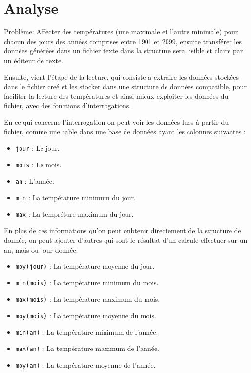 \section{Analyse}

Problème: Affecter des températures (une maximale et l’autre minimale) 
pour chacun des jours des années comprises entre 1901 et 2099,
ensuite transférer les données générées dans un fichier texte
dans la structure sera lisible et claire par un éditeur de texte.

Ensuite, vient l’étape de la lecture, qui consiste a extraire les données
 stockées dans le fichier creé et les stocker dans une 
 structure de données compatible, pour faciliter la lecture des températures
et ainsi mieux exploiter les données du fichier, avec des fonctions d’interrogations.

En ce qui concerne l'interrogation on peut voir les données lues à partir du fichier, 
comme une table dans une base de données ayant les colonnes suivantes : 

\begin{itemize}
  \item \lstinline$jour$ : Le jour.
  \item \lstinline$mois$ : Le mois.
  \item \lstinline$an$ : L'année.
  \item \lstinline$min$ : La température minimum du jour.
  \item \lstinline$max$ : La tempréture maximum du jour.
\end{itemize}

En plus de ces informations qu'on peut onbtenir directement de la structure de donnée, on peut
ajouter d'autres qui sont le résultat d'un calcule effectuer sur un an, mois ou jour donnée.

\begin{itemize}
  \item \lstinline$moy(jour)$ : La température moyenne du jour. 
  
  \item \lstinline$min(mois)$ : La température minimum du mois.
  \item \lstinline$max(mois)$ : La température maximum du mois.
  \item \lstinline$moy(mois)$ : La température moyenne du mois.
  
  \item \lstinline$min(an)$ : La température minimum de l'année.
  \item \lstinline$max(an)$ : La température maximum de l'année.
  \item \lstinline$moy(an)$ : La température moyenne de l'année.
\end{itemize}

